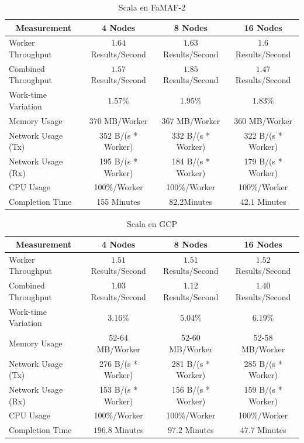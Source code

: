 \documentclass[11pt]{article}
\begin{document}
\begin{table}[H]
\centering
\begin{tabular}{|l|c|c|c|}
\hline
\multicolumn{1}{|c|}{Measurement} & 4 Nodes & 8 Nodes & 16 Nodes \\ \hline
Worker Throughput & $1.64$ Results/Second & $1.63$ Results/Second & $1.6$ Results/Second \\ \hline
Combined Throughput & $1.57$ Results/Second & $1.85$ Results/Second & $1.47$ Results/Second \\ \hline
Work-time Variation & $1.57\%$& $1.95\%$& $1.83\%$\\ \hline
Memory Usage & 370 MB/Worker & 367 MB/Worker & 360 MB/Worker \\ \hline
Network Usage (Tx) & 352 B/(s * Worker) & 332 B/(s * Worker) & 322 B/(s * Worker) \\ \hline
Network Usage (Rx) & 195 B/(s * Worker) & 184 B/(s * Worker) & 179 B/(s * Worker) \\ \hline
CPU Usage & 100\%/Worker & 100\%/Worker & 100\%/Worker \\ \hline
Completion Time & 155 Minutes & 82.2Minutes & $42.1$ Minutes \\ \hline
\end{tabular}
\caption{Scala en FaMAF-2}
\end{table}

\begin{table}[H]
\centering
\begin{tabular}{|l|c|c|c|}
\hline
\multicolumn{1}{|c|}{Measurement} & 4 Nodes & 8 Nodes & 16 Nodes \\ \hline
Worker Throughput & $1.51$ Results/Second & $1.51$ Results/Second & $1.52$ Results/Second \\ \hline
Combined Throughput & $1.03$ Results/Second & $1.12$ Results/Second & $1.40$ Results/Second \\ \hline
Work-time Variation & $3.16\%$& $5.04\%$& $6.19\%$\\ \hline
Memory Usage & 52-64 MB/Worker & 52-60 MB/Worker & 52-58 MB/Worker \\ \hline
Network Usage (Tx) & 276 B/(s * Worker) & 281 B/(s * Worker) & 285 B/(s * Worker) \\ \hline
Network Usage (Rx) & 153 B/(s * Worker) & 156 B/(s * Worker) & 159 B/(s * Worker) \\ \hline
CPU Usage & 100\%/Worker & 100\%/Worker & 100\%/Worker \\ \hline
Completion Time & $196.8$ Minutes & $97.2$ Minutes & $47.7$ Minutes \\ \hline
\end{tabular}
\caption{Scala en GCP}
\end{table}
\end{document}
